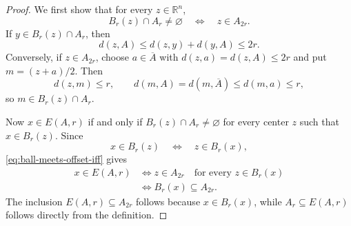 \documentclass[11pt]{article}
\newcommand{\R}{\mathbb R}
\numberwithin{equation}{section}
\begin{document}
\begin{proof}
We first show that for every $z\in\R^n$,
\begin{equation}\label{eq:ball-meets-offset-iff}
B_r(z)\cap A_r\ne\varnothing
\quad\Longleftrightarrow\quad
z\in A_{2r}.
\end{equation}
If $y\in B_r(z)\cap A_r$, then
\[
d(z,A)\le d(z,y)+d(y,A)\le2r.
\]
Conversely, if $z\in A_{2r}$, choose $a\in\overline A$ with $d(z,a)=d(z,A)\le2r$ and put $m=(z+a)/2$. Then
\[
d(z,m)\le r,
\qquad
d(m,A)=d(m,\overline A)\le d(m,a)\le r,
\]
so $m\in B_r(z)\cap A_r$.

Now $x\in E(A,r)$ if and only if $B_r(z)\cap A_r\ne\varnothing$ for every center $z$ such that $x\in B_r(z)$. Since
\[
x\in B_r(z)\quad\Longleftrightarrow\quad z\in B_r(x),
\]
\eqref{eq:ball-meets-offset-iff} gives
\[
\begin{aligned}
x\in E(A,r)
&\Longleftrightarrow z\in A_{2r}\quad\text{for every }z\in B_r(x)\\
&\Longleftrightarrow B_r(x)\subseteq A_{2r}.
\end{aligned}
\]
The inclusion $E(A,r)\subseteq A_{2r}$ follows because $x\in B_r(x)$, while $A_r\subseteq E(A,r)$ follows directly from the definition.
\end{proof}
\end{document}
